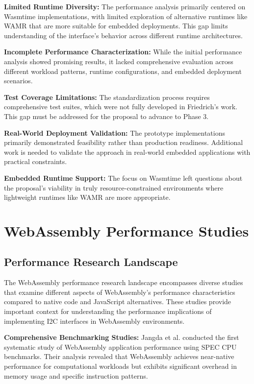 \textbf{Limited Runtime Diversity:} The performance analysis primarily centered on Wasmtime implementations, with limited exploration of alternative runtimes like WAMR that are more suitable for embedded deployments. This gap limits understanding of the interface's behavior across different runtime architectures.

\textbf{Incomplete Performance Characterization:} While the initial performance analysis showed promising results, it lacked comprehensive evaluation across different workload patterns, runtime configurations, and embedded deployment scenarios.

\textbf{Test Coverage Limitations:} The standardization process requires comprehensive test suites, which were not fully developed in Friedrich's work. This gap must be addressed for the proposal to advance to Phase 3.

\textbf{Real-World Deployment Validation:} The prototype implementations primarily demonstrated feasibility rather than production readiness. Additional work is needed to validate the approach in real-world embedded applications with practical constraints.

\textbf{Embedded Runtime Support:} The focus on Wasmtime left questions about the proposal's viability in truly resource-constrained environments where lightweight runtimes like WAMR are more appropriate.

\section{WebAssembly Performance Studies}
\label{sec:wasm-performance}

\subsection{Performance Research Landscape}
\label{subsec:performance-research}

The WebAssembly performance research landscape encompasses diverse studies that examine different aspects of WebAssembly's performance characteristics compared to native code and JavaScript alternatives. These studies provide important context for understanding the performance implications of implementing I2C interfaces in WebAssembly environments.

\textbf{Comprehensive Benchmarking Studies:} Jangda et al. conducted the first systematic study of WebAssembly application performance using SPEC CPU benchmarks\cite{jangda2019understanding}. Their analysis revealed that WebAssembly achieves near-native performance for computational workloads but exhibits significant overhead in memory usage and specific instruction patterns.

